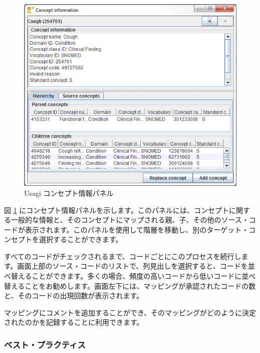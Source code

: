 \documentclass[
  11pt]{book}
\theoremstyle{definition}
\theoremstyle{definition}
\theoremstyle{definition}
\theoremstyle{definition}
\theoremstyle{remark}
\begin{document}
\begin{figure}

{\centering \includegraphics[width=1\linewidth]{images/ExtractTransformLoad/usagiConceptInfo} 

}

\caption{Usagi コンセプト情報パネル}\label{fig:usagiConceptInfo}
\end{figure}

図 \ref{fig:usagiConceptInfo} にコンセプト情報パネルを示します。このパネルには、コンセプトに関する一般的な情報と、そのコンセプトにマップされる親、子、その他のソース・コードが表示されます。このパネルを使用して階層を移動し、別のターゲット・コンセプトを選択することができます。

すべてのコードがチェックされるまで、コードごとにこのプロセスを続行します。画面上部のソース・コードのリストで、列見出しを選択すると、コードを並べ替えることができます。多くの場合、頻度の高いコードから低いコードに並べ替えることをお勧めします。画面左下には、マッピングが承認されたコードの数と、そのコードの出現回数が表示されます。

マッピングにコメントを追加することができ、そのマッピングがどのように決定されたのかを記録することに利用できます。

\subsubsection*{ベスト・プラクティス}\label{ux30d9ux30b9ux30c8ux30d7ux30e9ux30afux30c6ux30a3ux30b9}
\end{document}
